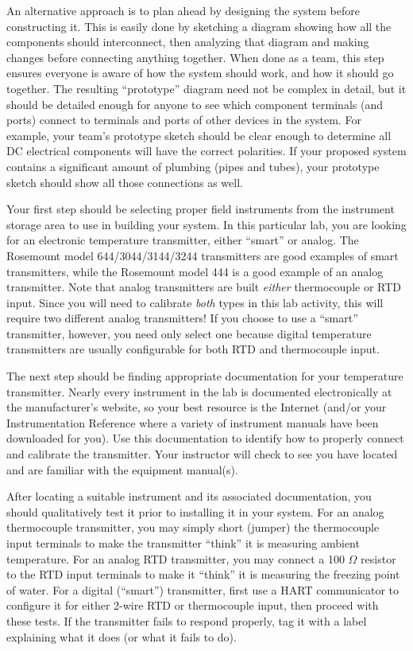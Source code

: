 An alternative approach is to plan ahead by designing the system before constructing it.  This is easily done by sketching a diagram showing how all the components should interconnect, then analyzing that diagram and making changes before connecting anything together.  When done as a team, this step ensures everyone is aware of how the system should work, and how it should go together.  The resulting ``prototype'' diagram need not be complex in detail, but it should be detailed enough for anyone to see which component terminals (and ports) connect to terminals and ports of other devices in the system.  For example, your team's prototype sketch should be clear enough to determine all DC electrical components will have the correct polarities.  If your proposed system contains a significant amount of plumbing (pipes and tubes), your prototype sketch should show all those connections as well.

\vskip 10pt

Your first step should be selecting proper field instruments from the instrument storage area to use in building your system.  In this particular lab, you are looking for an electronic temperature transmitter, either ``smart'' or analog.  The Rosemount model 644/3044/3144/3244 transmitters are good examples of smart transmitters, while the Rosemount model 444 is a good example of an analog transmitter.  Note that analog transmitters are built {\it either} thermocouple or RTD input.  Since you will need to calibrate {\it both} types in this lab activity, this will require two different analog transmitters!  If you choose to use a ``smart'' transmitter, however, you need only select one because digital temperature transmitters are usually configurable for both RTD and thermocouple input.

The next step should be finding appropriate documentation for your temperature transmitter.  Nearly every instrument in the lab is documented electronically at the manufacturer's website, so your best resource is the Internet (and/or your Instrumentation Reference where a variety of instrument manuals have been downloaded for you).  Use this documentation to identify how to properly connect and calibrate the transmitter.  Your instructor will check to see you have located and are familiar with the equipment manual(s).

After locating a suitable instrument and its associated documentation, you should qualitatively test it prior to installing it in your system.  For an analog thermocouple transmitter, you may simply short (jumper) the thermocouple input terminals to make the transmitter ``think'' it is measuring ambient temperature.  For an analog RTD transmitter, you may connect a 100 $\Omega$ resistor to the RTD input terminals to make it ``think'' it is measuring the freezing point of water.  For a digital (``smart'') transmitter, first use a HART communicator to configure it for either 2-wire RTD or thermocouple input, then proceed with these tests.  If the transmitter fails to respond properly, tag it with a label explaining what it does (or what it fails to do).

